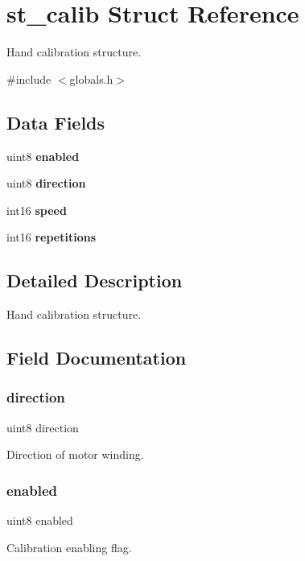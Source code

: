 \section{st\+\_\+calib Struct Reference}
\label{structst__calib}


Hand calibration structure.  




{\ttfamily \#include $<$globals.\+h$>$}

\subsection*{Data Fields}
\begin{DoxyCompactItemize}
\item 
uint8 \textbf{ enabled}
\item 
uint8 \textbf{ direction}
\item 
int16 \textbf{ speed}
\item 
int16 \textbf{ repetitions}
\end{DoxyCompactItemize}


\subsection{Detailed Description}
Hand calibration structure. 



\subsection{Field Documentation}
\mbox{\label{structst__calib_a99283a3fa628676ec7ca1edcba1fea6a}} 
\subsubsection{direction}
{\footnotesize\ttfamily uint8 direction}

Direction of motor winding. \mbox{\label{structst__calib_a2333939d3e81212884efcaa5bb1c1ec1}} 
\subsubsection{enabled}
{\footnotesize\ttfamily uint8 enabled}

Calibration enabling flag. \mbox{\label{structst__calib_a6d03a0b0677c33357a5d3b49bc296205}} 
